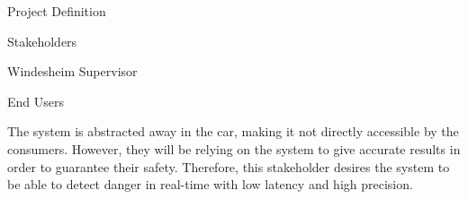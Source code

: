 \documentclass{matthijs}
\begin{document}
\begin{hoofdstuk}{Project Definition}
\begin{paragraaf}{Stakeholders}
\begin{subparagraaf}{Windesheim Supervisor}
			\end{subparagraaf}

			\begin{subparagraaf}{End Users}

				The system is abstracted away in the car, making it not directly accessible by the consumers.
				However, they will be relying on the system to give accurate results in order to guarantee their safety.
				Therefore, this stakeholder desires the system to be able to detect danger in real-time with low latency and high precision.

			\end{subparagraaf}

		\end{paragraaf}

	\end{hoofdstuk}
	
\end{document}
